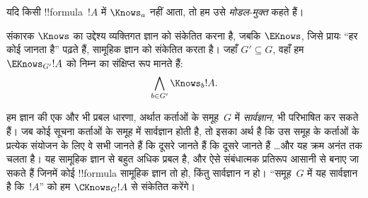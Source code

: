 \documentclass[../../../include/open-logic-section]{subfiles}
\begin{document}
यदि किसी !!{formula}~$!A$ में $\Knows_a$ नहीं आता, तो हम उसे
\emph{मोडल-मुक्त} कहते हैं।

\begin{defn}
  संकारक $\Knows$ का उद्देश्य व्यक्तिगत ज्ञान को संकेतित करना है, जबकि
  $\EKnows$, जिसे प्रायः ``हर कोई जानता है'' पढ़ते हैं, सामूहिक ज्ञान को
  संकेतित करता है। जहाँ $G' \subseteq G$, वहाँ हम $\EKnows_{G'} !A$ को
  निम्न का संक्षिप्त रूप मानते हैं:
  \[\bigwedge_{b \in G'} \Knows_b !A.\]
\end{defn}

हम ज्ञान की एक और भी प्रबल धारणा, अर्थात कर्ताओं के समूह~$G$ में
\emph{सार्वज्ञान}, भी परिभाषित कर सकते हैं। जब कोई सूचना कर्ताओं के समूह
में सार्वज्ञान होती है, तो इसका अर्थ है कि उस समूह के कर्ताओं के प्रत्येक
संयोजन के लिए वे सभी जानते हैं कि दूसरे जानते हैं कि दूसरे जानते हैं
\dots और यह क्रम अनंत तक चलता है। यह सामूहिक ज्ञान से बहुत अधिक प्रबल है,
और ऐसे संबंधात्मक प्रतिरूप आसानी से बनाए जा सकते हैं जिनमें कोई !!{formula}
सामूहिक ज्ञान तो हो, किंतु सार्वज्ञान न हो। ``समूह~$G$ में यह सार्वज्ञान है
कि~$!A$'' को हम $\CKnows_G !A$ से संकेतित करेंगे।
\end{document}
